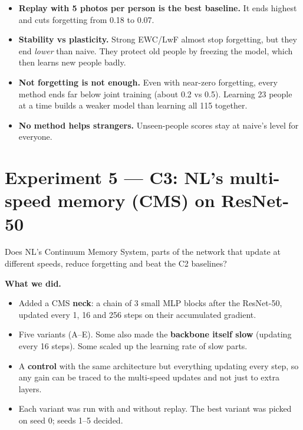 \documentclass[11pt,a4paper]{article}
\begin{document}
\begin{means}
\begin{itemize}[leftmargin=1.2em]
  \item \textbf{Replay with 5 photos per person is the best baseline.} It ends highest and cuts forgetting from 0.18 to 0.07.
  \item \textbf{Stability vs plasticity.} Strong EWC/LwF almost stop forgetting, but they end \emph{lower} than naive. They protect old people by freezing the model, which then learns new people badly.
  \item \textbf{Not forgetting is not enough.} Even with near-zero forgetting, every method ends far below joint training (about 0.2 vs 0.5). Learning 23 people at a time builds a weaker model than learning all 115 together.
  \item \textbf{No method helps strangers.} Unseen-people scores stay at naive's level for everyone.
\end{itemize}
\end{means}

\section{Experiment 5 --- C3: NL's multi-speed memory (CMS) on ResNet-50}

\begin{question}
Does NL's Continuum Memory System, parts of the network that update at different speeds, reduce forgetting and beat the C2 baselines?
\end{question}

\textbf{What we did.}
\begin{itemize}
  \item Added a CMS \textbf{neck}: a chain of 3 small MLP blocks after the ResNet-50, updated every 1, 16 and 256 steps on their accumulated gradient.
  \item Five variants (A--E). Some also made the \textbf{backbone itself slow} (updating every 16 steps). Some scaled up the learning rate of slow parts.
  \item A \textbf{control} with the same architecture but everything updating every step, so any gain can be traced to the multi-speed updates and not just to extra layers.
  \item Each variant was run with and without replay. The best variant was picked on seed 0; seeds 1--5 decided.
\end{itemize}
\end{document}

